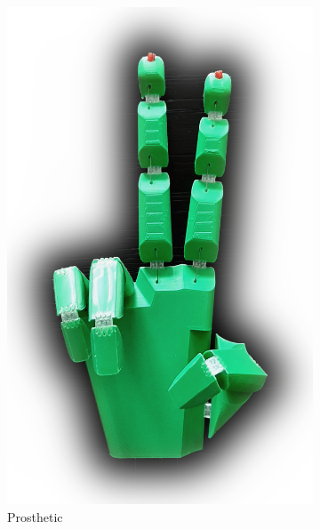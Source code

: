 \begin{figure}
\begin{subfigure}[B]{.33\columnwidth}
		\includegraphics[width=\columnwidth]{sources/applications/prosthetic.jpg}
		\caption{Prosthetic}
	\end{subfigure}
	\begin{subfigure}[B]{.33\columnwidth}
		\centering

\end{subfigure}
\end{figure}
